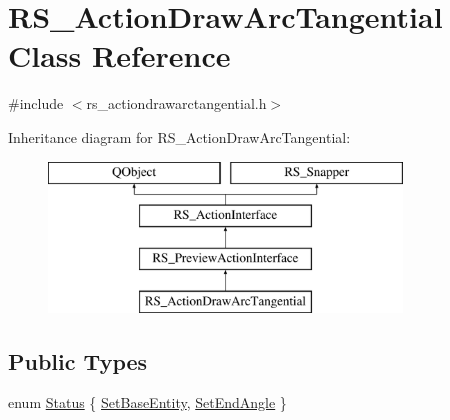 \hypertarget{classRS__ActionDrawArcTangential}{\section{R\-S\-\_\-\-Action\-Draw\-Arc\-Tangential Class Reference}
\label{classRS__ActionDrawArcTangential}
}


{\ttfamily \#include $<$rs\-\_\-actiondrawarctangential.\-h$>$}

Inheritance diagram for R\-S\-\_\-\-Action\-Draw\-Arc\-Tangential\-:\begin{figure}[H]
\begin{center}
\leavevmode
\includegraphics[height=4.000000cm]{classRS__ActionDrawArcTangential}
\end{center}
\end{figure}
\subsection*{Public Types}
\begin{DoxyCompactItemize}
\item 
enum \hyperlink{classRS__ActionDrawArcTangential_a64a8a77f45d438b8da2b64a9c735eafd}{Status} \{ \hyperlink{classRS__ActionDrawArcTangential_a64a8a77f45d438b8da2b64a9c735eafdaefd5067c5b858c6751389c1bb66fa81a}{Set\-Base\-Entity}, 
\hyperlink{classRS__ActionDrawArcTangential_a64a8a77f45d438b8da2b64a9c735eafdaacd4bcca25c4aa8c18dbd041a8365d2b}{Set\-End\-Angle}
 \}
\end{DoxyCompactItemize}

